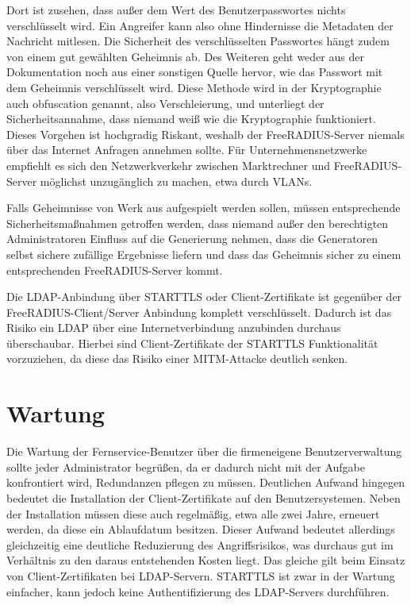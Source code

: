 \documentclass[11pt,a4paper]{report}
\begin{document}
Dort ist zusehen, dass außer dem Wert des Benutzerpasswortes nichts verschlüsselt wird. Ein Angreifer kann also ohne Hindernisse die Metadaten der Nachricht mitlesen. Die Sicherheit des verschlüsselten Passwortes hängt zudem von einem gut gewählten Geheimnis ab. Des Weiteren geht weder aus der Dokumentation noch aus einer sonstigen Quelle hervor, wie das Passwort mit dem Geheimnis verschlüsselt wird. Diese Methode wird in der Kryptographie auch obfuscation genannt, also Verschleierung, und unterliegt der Sicherheitsannahme, dass niemand weiß wie die Kryptographie funktioniert. Dieses Vorgehen ist hochgradig Riskant, weshalb der FreeRADIUS-Server niemals über das Internet Anfragen annehmen sollte. Für Unternehmensnetzwerke empfiehlt es sich den Netzwerkverkehr zwischen Marktrechner und FreeRADIUS-Server möglichst unzugänglich zu machen, etwa durch VLANs.

Falls Geheimnisse von Werk aus aufgespielt werden sollen, müssen entsprechende Sicherheitsmaßnahmen getroffen werden, dass niemand außer den berechtigten Administratoren Einfluss auf die Generierung nehmen, dass die Generatoren selbst sichere zufällige Ergebnisse liefern und dass das Geheimnis sicher zu einem entsprechenden FreeRADIUS-Server kommt.

Die LDAP-Anbindung über STARTTLS oder Client-Zertifikate ist gegenüber der FreeRADIUS-Client/Server Anbindung komplett verschlüsselt. Dadurch ist das Risiko ein LDAP über eine Internetverbindung anzubinden durchaus überschaubar. Hierbei sind Client-Zertifikate der STARTTLS Funktionalität vorzuziehen, da diese das Risiko einer MITM-Attacke deutlich senken.

\section{Wartung}

Die Wartung der Fernservice-Benutzer über die firmeneigene Benutzerverwaltung sollte jeder Administrator begrüßen, da er dadurch nicht mit der Aufgabe konfrontiert wird, Redundanzen pflegen zu müssen. Deutlichen Aufwand hingegen bedeutet die Installation der Client-Zertifikate auf den Benutzersystemen. Neben der Installation müssen diese auch regelmäßig, etwa alle zwei Jahre, erneuert werden, da diese ein Ablaufdatum besitzen. Dieser Aufwand bedeutet allerdings gleichzeitig eine deutliche Reduzierung des Angriffsrisikos, was durchaus gut im Verhältnis zu den daraus entstehenden Kosten liegt. Das gleiche gilt beim Einsatz von Client-Zertifikaten bei LDAP-Servern. STARTTLS ist zwar in der Wartung einfacher, kann jedoch keine Authentifizierung des LDAP-Servers durchführen. 
\end{document}
